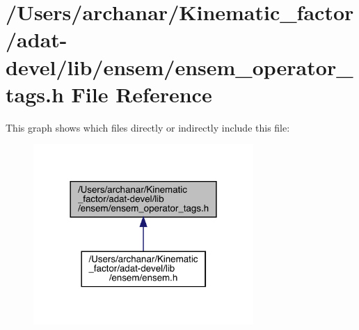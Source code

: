 \hypertarget{adat-devel_2lib_2ensem_2ensem__operator__tags_8h}{}\section{/\+Users/archanar/\+Kinematic\+\_\+factor/adat-\/devel/lib/ensem/ensem\+\_\+operator\+\_\+tags.h File Reference}
\label{adat-devel_2lib_2ensem_2ensem__operator__tags_8h}
This graph shows which files directly or indirectly include this file\+:
\nopagebreak
\begin{figure}[H]
\begin{center}
\leavevmode
\includegraphics[width=237pt]{d4/db9/adat-devel_2lib_2ensem_2ensem__operator__tags_8h__dep__incl}
\end{center}
\end{figure}
